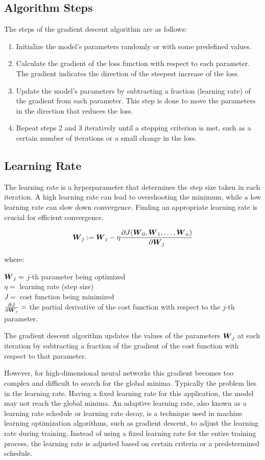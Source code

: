 \documentclass{report}
\begin{document}
\subsection{Algorithm Steps}
The steps of the gradient descent algorithm are as follows:
    
    \begin{enumerate}
        \item Initialize the model's parameters randomly or with some predefined values.
        \item Calculate the gradient of the loss function with respect to each parameter. The gradient indicates the direction of the steepest increase of the loss.
        \item Update the model's parameters by subtracting a fraction (learning rate) of the gradient from each parameter. This step is done to move the parameters in the direction that reduces the loss.
        \item Repeat steps 2 and 3 iteratively until a stopping criterion is met, such as a certain number of iterations or a small change in the loss.
    \end{enumerate}
    
\subsection{Learning Rate}
The learning rate is a hyperparameter that determines the step size taken in each iteration. A high learning rate can lead to overshooting the minimum, while a low learning rate can slow down convergence. Finding an appropriate learning rate is crucial for efficient convergence.

$$\boldsymbol{W}_{j} := \boldsymbol{W}_{j} - \eta \frac{\partial J(\boldsymbol{W}_{0},\boldsymbol{W}_{1},\ldots,\boldsymbol{W}_{n})}{\partial \boldsymbol{W}_{j}}$$

where:

$\boldsymbol{W}_{j} = $ $j$-th parameter being optimized \\ $\eta = $ learning rate (step size) \\ $J = $ cost function being minimized \\ $\frac{\partial J}{\partial \boldsymbol{W}_{j}} = $ the partial derivative of the cost function with respect to the $j$-th parameter.

The gradient descent algorithm updates the values of the parameters $\boldsymbol{W}_{j}$ at each iteration by subtracting a fraction of the gradient of the cost function with respect to that parameter.

However, for high-dimensional neural networks this gradient becomes too complex and difficult to search for the global minima. Typically the problem lies in the learning rate. Having a fixed learning rate for this application, the model may not reach the global minima. An adaptive learning rate, also known as a learning rate schedule or learning rate decay, is a technique used in machine learning optimization algorithms, such as gradient descent, to adjust the learning rate during training. Instead of using a fixed learning rate for the entire training process, the learning rate is adjusted based on certain criteria or a predetermined schedule.
\end{document}
